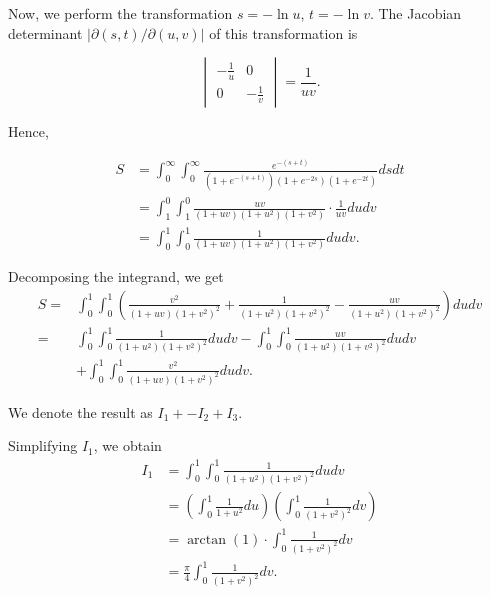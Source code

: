 \documentclass{article}
\begin{document}
\vspace{5mm}

Now, we perform the transformation $s=-\ln u$, $t= -\ln v$. The Jacobian determinant $|\partial(s,t)/\partial(u,v)|$ of this transformation is 

\[
\begin{vmatrix}
-\frac{1}{u} & 0  \\
0 & -\frac{1}{v}
\end{vmatrix} = \frac{1}{uv}.
\]

\vspace{5mm}

Hence,

\begin{align*}
    S &= \int_{0}^{\infty}\int_{0}^{\infty}\frac{e^{-(s+t)}}{(1+e^{-(s+t)})(1+e^{-2s})(1+e^{-2t})}dsdt\\
    &= \int_{1}^{0}\int_{1}^{0}\frac{uv}{(1+uv)(1+u^2)(1+v^2)}\cdot\frac{1}{uv}dudv \\
    &= \int_{0}^{1}\int_{0}^{1}\frac{1}{(1+uv)(1+u^2)(1+v^2)}dudv. 
\end{align*}

\vspace{5mm}

Decomposing the integrand, we get
\begin{align*}
    S = &\int_{0}^{1}\int_{0}^{1}\left(\frac{v^2}{(1+uv)(1+v^2)^2}+\frac{1}{(1+u^2)(1+v^2)^2}-\frac{uv}{(1+u^2)(1+v^2)^2}\right)dudv \\
    = &\int_{0}^{1}\int_{0}^{1}\frac{1}{(1+u^2)(1+v^2)^2}dudv-\int_{0}^{1}\int_{0}^{1}\frac{uv}{(1+u^2)(1+v^2)^2}dudv \\&+\int_{0}^{1}\int_{0}^{1}\frac{v^2}{(1+uv)(1+v^2)^2}dudv.
\end{align*}

We denote the result as $I_1+-I_2+I_3$.

\vspace{5mm}

Simplifying $I_1$, we obtain
\begin{align*}
    I_1&=\int_{0}^{1}\int_{0}^{1}\frac{1}{(1+u^2)(1+v^2)^2}dudv \\&=\left(\int_{0}^{1}\frac{1}{1+u^2}du\right)\left(\int_{0}^{1}\frac{1}{(1+v^2)^2}dv\right) \\
    &=\arctan(1) \cdot \int_{0}^{1}\frac{1}{(1+v^2)^2}dv \\
    &=\frac{\pi}{4}\int_{0}^{1}\frac{1}{(1+v^2)^2}dv.
\end{align*}

\vspace{60mm}
\end{document}
